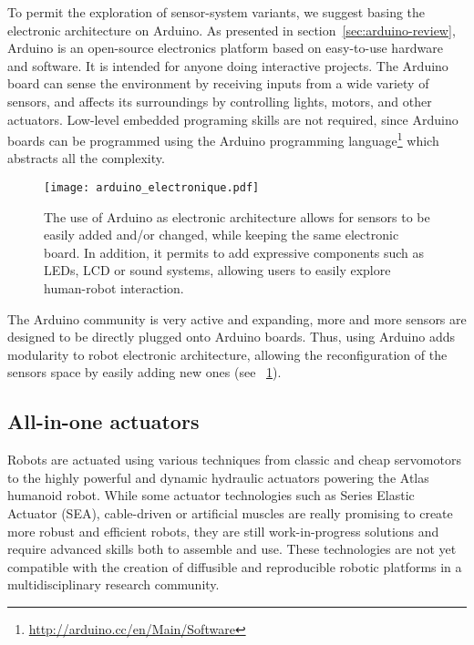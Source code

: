 To permit the exploration of sensor-system variants, we suggest basing the electronic architecture on Arduino. As presented in section~\ref{sec:arduino-review}, Arduino is an open-source electronics platform based on easy-to-use hardware and software. It is intended for anyone doing interactive projects. The Arduino board can sense the environment by receiving inputs from a wide variety of sensors, and affects its surroundings by controlling lights, motors, and other actuators. Low-level embedded programing skills are not required, since Arduino boards can be programmed using the Arduino programming language\footnote{\url{http://arduino.cc/en/Main/Software}} which abstracts all the complexity.

\begin{figure}[tb]
    \begin{center}
        \texttt{[image: arduino\_electronique.pdf]}
    \end{center}
    \caption{The use of Arduino as electronic architecture  allows for sensors to be easily added and/or changed, while keeping the same electronic board. In addition, it permits to add expressive components such as LEDs, LCD or sound systems, allowing users to easily explore human-robot interaction.}
    \label{fig:arduino_modular_electronic}
\end{figure}


The Arduino community is very active and expanding, more and more sensors are designed to be directly plugged onto Arduino boards. Thus, using Arduino adds modularity to robot electronic architecture, allowing the reconfiguration of the sensors space by easily adding new ones (see \figurename~\ref{fig:arduino_modular_electronic}).


\subsection{All-in-one actuators} %

Robots are actuated using various techniques from classic and cheap servomotors to the highly powerful and dynamic hydraulic actuators powering the Atlas humanoid robot.
While some actuator technologies such as Series Elastic Actuator (SEA), cable-driven or artificial muscles are really promising to create more robust and efficient robots, they are still work-in-progress solutions and require advanced skills both to assemble and use. These technologies are not yet compatible with the creation of diffusible and reproducible robotic platforms in a multidisciplinary research community.

